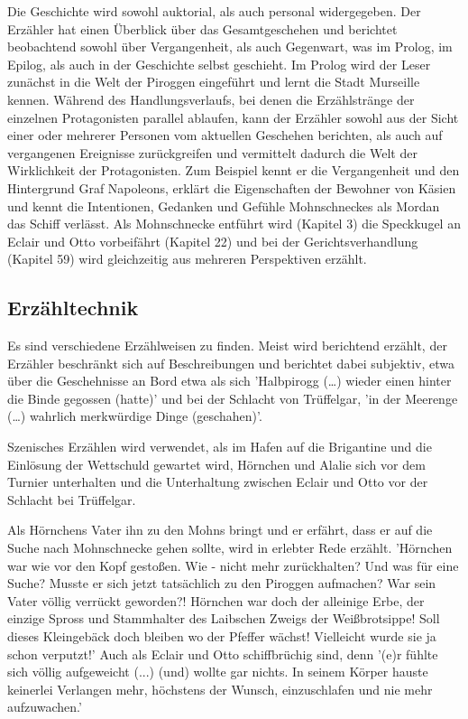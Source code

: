 {Die Geschichte wird sowohl auktorial, als auch personal widergegeben. Der Erzähler hat einen Überblick über das Gesamtgeschehen und berichtet  beobachtend sowohl über Vergangenheit, als auch Gegenwart, was im Prolog, im Epilog, als auch in der Geschichte selbst geschieht. 
Im Prolog wird der Leser zunächst in die Welt der Piroggen eingeführt und lernt die Stadt Murseille kennen. Während des Handlungsverlaufs, bei denen die Erzählstränge der einzelnen Protagonisten parallel ablaufen, kann der Erzähler sowohl aus der Sicht einer oder mehrerer Personen vom aktuellen Geschehen berichten, als auch auf vergangenen Ereignisse zurückgreifen und vermittelt dadurch die Welt der Wirklichkeit der Protagonisten. Zum Beispiel kennt er die Vergangenheit und den Hintergrund Graf Napoleons, \cite[S.17f]{pir} erklärt die Eigenschaften der Bewohner von Käsien \cite[S.140f]{pir} und kennt die Intentionen, Gedanken und Gefühle Mohnschneckes als Mordan das Schiff verlässt.\cite[S.374]{pir} Als Mohnschnecke entführt wird (Kapitel 3) die Speckkugel an Eclair und Otto vorbeifährt (Kapitel 22) und bei der Gerichtsverhandlung (Kapitel 59) wird gleichzeitig aus mehreren Perspektiven erzählt.



\subsection{Erzähltechnik}

Es sind verschiedene Erzählweisen zu finden. 
Meist wird berichtend erzählt, der Erzähler beschränkt sich auf Beschreibungen und berichtet dabei subjektiv, etwa über die Geschehnisse an Bord etwa als sich 'Halbpirogg (…) wieder einen hinter die Binde gegossen (hatte)' \cite[S.298]{pir} und bei der Schlacht von Trüffelgar, 'in der Meerenge (…) wahrlich merkwürdige Dinge (geschahen)'.\cite[S.444]{pir} 

Szenisches Erzählen wird verwendet, als im Hafen auf die Brigantine und die Einlösung der Wettschuld gewartet wird,\cite[S.117]{pir} Hörnchen und Alalie sich vor dem Turnier unterhalten\cite[S.340]{pir} und die Unterhaltung zwischen Eclair und Otto vor der Schlacht bei Trüffelgar. \cite[S.414ff]{pir} 

Als Hörnchens Vater ihn zu den Mohns bringt und er erfährt, dass er auf die Suche nach Mohnschnecke gehen sollte, wird in erlebter Rede erzählt.\cite[S.84]{pir} 'Hörnchen war wie vor den Kopf gestoßen. Wie - nicht mehr zurückhalten? Und was für eine Suche? Musste er sich jetzt tatsächlich zu den Piroggen aufmachen? War sein Vater völlig verrückt geworden?! Hörnchen war doch der alleinige Erbe, der einzige Spross und Stammhalter des Laibschen Zweigs der Weißbrotsippe! Soll dieses Kleingebäck doch bleiben wo der Pfeffer wächst! Vielleicht wurde sie ja schon verputzt!'\cite[S.84]{pir}
Auch als Eclair und Otto schiffbrüchig sind,\cite[S.209f]{pir} denn '(e)r fühlte sich völlig aufgeweicht (...) (und) wollte gar nichts. In seinem Körper hauste keinerlei Verlangen mehr, höchstens der Wunsch, einzuschlafen und nie mehr aufzuwachen.'\cite[S.209f]{pir} 

}
